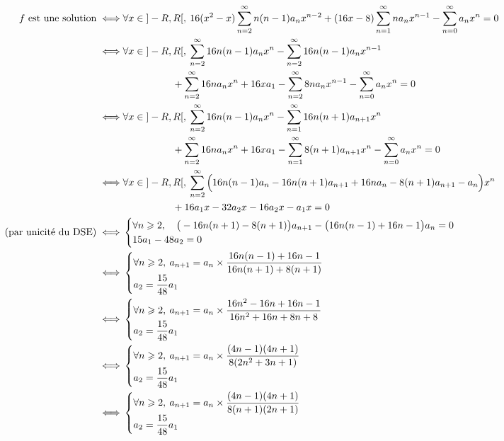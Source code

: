\documentclass[a4paper]{article}
\begin{document}
		\begin{align*}
			f \text{ est une solution}
			\iff& \forall x \in {]-R,R[},\: 16 (x^2 - x) \sum_{n=2}^\infty n(n-1) a_n x^{n-2} + (16x - 8) \sum_{n=1}^\infty n a_n x^{n-1} - \sum_{n=0}^\infty a_n x^n = 0\\
			\iff& \forall x \in {]-R,R[},\: \sum_{n=2}^\infty 16n(n-1)a_n x^n - \sum_{n=2}^\infty 16n(n-1)a_n x^{n-1}\\
			&\quad\quad\quad\quad\quad+ \sum_{n=2}^\infty 16na_n x^n + 16x a_1 - \sum_{n=2}^\infty 8n a_n x^{n-1} - \sum_{n=0}^\infty a_n x^n = 0 \\
			\iff& \forall x \in {]-R,R[},\: \sum_{n=2}^\infty 16n(n-1)a_n x^n - \sum_{n=1}^\infty 16n(n+1)a_{n+1} x^n\\
			&\quad\quad\quad\quad\quad+ \sum_{n=2}^\infty 16na_n x^n + 16x a_1 - \sum_{n=1}^\infty 8(n+1) a_{n+1} x^n - \sum_{n=0}^\infty a_n x^n = 0 \\
			\iff& \forall x \in {]-R,R[},\: \sum_{n=2}^\infty \Big(16n(n-1)a_n - 16 n(n+1)a_{n+1} + 16na_n - 8(n+1)a_{n+1} - a_n \Big) x^n\\
			&\quad\quad\quad\quad\quad+ 16a_1x - 32a_2x - 16a_2x - a_1x = 0\\
			\mathllap{\text{(par unicité du DSE)}}\iff& \begin{cases}
				\forall n \ge 2,\quad \big(-16n(n+1) - 8(n+1)\big)a_{n+1} - \big(16n(n-1) + 16n - 1\big)a_n = 0\\
				15 a_1 - 48 a_2 = 0
			\end{cases} \\
			\iff& \begin{cases}
				\ds\forall n \ge 2,\: a_{n+1} = a_n \times \frac{16n(n-1) + 16n - 1}{16n(n+1) + 8(n+1)}\\
				\ds a_2 = \frac{15}{48} a_1
			\end{cases} \\
			\iff& \begin{cases}
				\ds \forall n \ge 2,\: a_{n+1} = a_n \times \frac{16n^2 - 16n + 16n - 1}{16n^2 + 16n + 8n + 8}\\
				\ds a_{2} = \frac{15}{48} a_1
			\end{cases} \\
			\iff& \begin{cases}
				\ds \forall n \ge 2,\: a_{n+1} = a_n \times \frac{(4n - 1)(4n+1)}{8(2n^2 + 3n + 1)}\\
				\ds a_2 = \frac{15}{48} a_1
			\end{cases} \\
			\iff& \begin{cases}
				\ds \forall n \ge 2,\: a_{n+1} = a_n \times \frac{(4n - 1)(4n+1)}{8(n + 1)(2n+1)}\\
				\ds a_2 = \frac{15}{48} a_1
			\end{cases} \\
		\end{align*}
\end{document}
